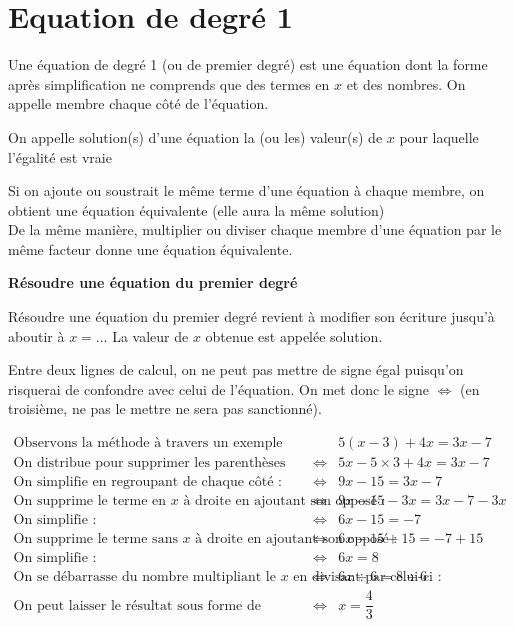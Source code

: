 \section{Equation de degré 1}

{Une équation de degré 1 (ou de premier degré) est une équation dont la forme après simplification ne comprends que des termes en $x$ et des nombres.
On appelle membre chaque côté de l'équation.}


{On appelle solution(s) d'une équation la (ou les) valeur(s) de $x$ pour laquelle l'égalité est vraie}


{Si on ajoute ou soustrait le même terme d'une équation à chaque membre, on obtient une équation équivalente (elle aura la même solution)\\
De la même manière, multiplier ou diviser chaque membre d'une équation par le même facteur donne une équation équivalente.
}

\textbf{Résoudre une équation du premier degré}

Résoudre une équation du premier degré revient à modifier son écriture jusqu'à aboutir à $x=\dots$
La valeur de $x$ obtenue est appelée solution.

Entre deux lignes de calcul, on ne peut pas mettre de signe égal puisqu'on risquerai de confondre avec celui de l'équation. On met donc le signe $\iff$ (en troisième, ne pas le mettre ne sera pas sanctionné).

\begin{align*}
    \text{Observons la méthode à travers un exemple :}& & &5(x-3)+4x=3x-7\\
    \text{On distribue pour supprimer les parenthèses :}& & \iff & 5x-5\times 3 +4x =3x-7\\
    \text{On simplifie en regroupant de chaque côté :}& & \iff & 9x-15=3x-7\\
    \text{On supprime le terme en $x$ à droite en ajoutant son opposé :} & & \iff & 9x-15-3x=3x-7-3x\\
    \text{On simplifie :}& & \iff &6x-15=-7\\
    \text{On supprime le terme sans $x$ à droite en ajoutant son opposé :}& & \iff &6x-15 +15=-7+15\\
    \text{On simplifie :}& &\iff & 6x=8\\
    \text{On se débarrasse du nombre multipliant le $x$ en divisant par celui-ci :} && \iff &6x\div 6=8\div 6\\
    \text{On peut laisser le résultat sous forme de fraction simplifié :} &&\iff &x=\dfrac{4}{3}
\end{align*}